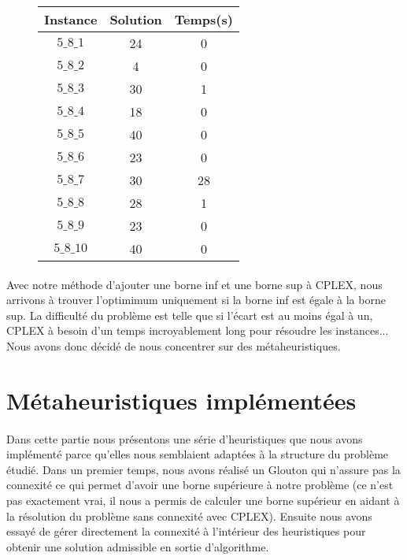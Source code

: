 \documentclass[a4paper, 11pt]{article} %
\begin{document}
\begin{center}
  \begin{figure}[H]
    \begin{tabular}{|c|c|c|}
      \hline 
      Instance & Solution & Temps(s) \\ \hline
      $5\_8\_1$ & 24 & 0 \\ \hline
      $5\_8\_2$ & 4 & 0 \\ \hline
      $5\_8\_3$ & 30 & 1 \\ \hline
      $5\_8\_4$ & 18 & 0 \\ \hline
      $5\_8\_5$ & 40 & 0 \\ \hline
      $5\_8\_6$ & 23 & 0 \\ \hline
      $5\_8\_7$ & 30 & 28 \\ \hline
      $5\_8\_8$ & 28 & 1 \\ \hline
      $5\_8\_9$ & 23 & 0 \\ \hline
      $5\_8\_10$  & 40 & 0 \\ \hline
      \end{tabular}
    \end{figure}
\end{center}


\paragraph*{}
Avec notre méthode d'ajouter une borne inf et une borne sup à CPLEX, nous arrivons à trouver l'optimimum uniquement si la borne inf est égale à la borne sup. La difficulté du problème est telle que si l'écart est au moins égal à un, CPLEX à besoin d'un temps incroyablement long pour résoudre les instances... Nous avons donc décidé de nous concentrer sur des métaheuristiques.

\section{Métaheuristiques implémentées}

\paragraph*{}
Dans cette partie nous présentons une série d'heuristiques que nous avons implémenté parce qu'elles nous semblaient adaptées à la structure du problème étudié. Dans un premier temps, nous avons réalisé un Glouton qui n'assure pas la connexité ce qui permet d'avoir une borne supérieure à notre problème (ce n'est pas exactement vrai, il nous a permis de calculer une borne supérieur en aidant à la résolution du problème sans connexité avec CPLEX). Ensuite nous avons essayé de gérer directement la connexité à l'intérieur des heuristiques pour obtenir une solution admissible en sortie d'algorithme.
\end{document}
